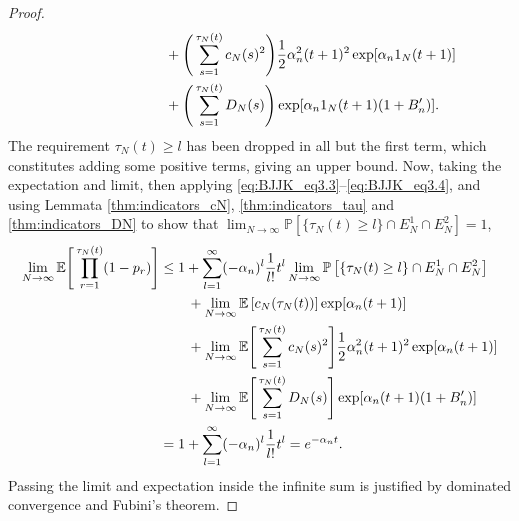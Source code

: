 \documentclass[12pt,authoryear]{article}
\theoremstyle{definition}
\newcommand{\Prob}{\mathbb{P}}
\newcommand{\E}{\mathbb{E}}
\newcommand{\1}[1]{\mathbbm{1}_{#1}}
\newcommand{\ON}{1_N}
\begin{document}
\begin{proof}
\begin{align}
    &\phantom{\prod_{r=1}^{\tau_N(t)} (1-p_r) \leq 1} + \Bigg( \sum_{s=1}^{\tau_N(t)} c_N(s)^2 \Bigg)
        \frac{1}{2} \alpha_n^2 (t+1)^2 \exp[ \alpha_n \ON (t+1) ] \notag\\
    &\phantom{\prod_{r=1}^{\tau_N(t)} (1-p_r) \leq 1} + \Bigg( \sum_{s=1}^{\tau_N(t)} D_N(s) \Bigg)
        \exp[ \alpha_n \ON (t+1) (1+B_n^\prime) ] . \label{eq:021}
\end{align}
The requirement $\tau_N(t) \geq l$ has been dropped in all but the first term, which constitutes adding some positive terms, giving an upper bound.
Now, taking the expectation and limit, then applying \eqref{eq:BJJK_eq3.3}--\eqref{eq:BJJK_eq3.4}, and using Lemmata \ref{thm:indicators_cN}, \ref{thm:indicators_tau} and \ref{thm:indicators_DN} to show that $\lim_{N\to\infty} \Prob \left[ \{\tau_N(t) \geq l\} \cap E_N^1 \cap E_N^2 \right] =1$,
\begin{align}
\lim_{N\to\infty} \E \Bigg[ \prod_{r=1}^{\tau_N(t)} (1-p_r) \Bigg]
&\leq 1+ \sum_{l=1}^{\infty} (-\alpha_n)^l \frac{1}{l!} t^l
        \lim_{N\to\infty} \Prob \left[ \{\tau_N(t) \geq l\} \cap E_N^1 \cap E_N^2 \right] \notag\\
    &\qquad+ \lim_{N\to\infty} \E \left[ c_N(\tau_N(t)) \right]
        \exp[ \alpha_n (t+1) ] \notag\\
    &\qquad+ \lim_{N\to\infty} \E \Bigg[ \sum_{s=1}^{\tau_N(t)} 
        c_N(s)^2 \Bigg]
        \frac{1}{2} \alpha_n^2 (t+1)^2 \exp[ \alpha_n (t+1) ] \notag\\
    &\qquad+ \lim_{N\to\infty} \E \Bigg[ \sum_{s=1}^{\tau_N(t)} D_N(s) \Bigg]
        \exp[ \alpha_n (t+1) (1+B_n^\prime) ] \notag\\
&= 1+ \sum_{l=1}^{\infty} (-\alpha_n)^l \frac{1}{l!} t^l
= e^{-\alpha_n t}. \label{eq:022}
\end{align}
Passing the limit and expectation inside the infinite sum is justified by dominated convergence and Fubini's theorem.


\end{proof}
\end{document}
